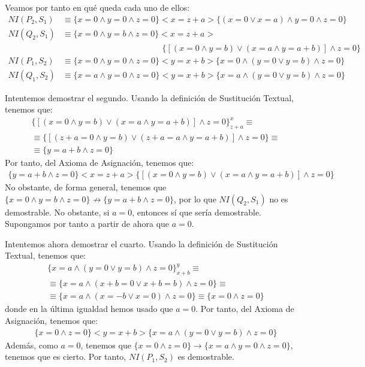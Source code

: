 \begin{ejercicio}
    Veamos por tanto en qué queda cada uno de ellos:
    \begin{align*}
        NI(P_2, S_1) & \equiv \{x=0 \land y=0 \land z=0\} <x=z+a> \{(x=0\lor x=a) \land y=0 \land z=0\} \\
        NI(Q_2, S_1) & \equiv \{x=0 \land y=b \land z=0\} <x=z+a>\\&\hspace{5cm} \{[(x=0\land y=b) \lor (x=a\land y=a+b)] \land z=0\} \\
        NI(P_1, S_2) & \equiv \{x=0 \land y=0 \land z=0\} <y=x+b> \{x=0 \land (y=0\lor y=b) \land z=0\} \\
        NI(Q_1, S_2) & \equiv \{x=a \land y=0 \land z=0\} <y=x+b> \{x=a \land (y=0\lor y=b) \land z=0\}
    \end{align*}

    Intentemos demostrar el segundo. Usando la definición de Sustitución Textual, tenemos que:
    \begin{multline*}
        \{[(x=0\land y=b) \lor (x=a\land y=a+b)] \land z=0\}_{z+a}^x \equiv \\ \equiv \{[(z+a=0\land y=b) \lor (z+a=a\land y=a+b)] \land z=0\} \equiv \\ \equiv \{y=a+b \land z=0\}
    \end{multline*}
    Por tanto, del Axioma de Asignación, tenemos que:
    \begin{multline*}
        \{y=a+b \land z=0\} <x=z+a> \{[(x=0\land y=b) \lor (x=a\land y=a+b)] \land z=0\}
    \end{multline*}
    No obstante, de forma general, tenemos que $\{x=0\land y=b\land z=0\}\not\rightarrow\{y=a+b \land z=0\}$, por lo que $NI(Q_2, S_1)$ no es demostrable. No obstante, si $a=0$, entonces sí que sería demostrable. Supongamos por tanto a partir de ahora que \ul{$a=0$}.

    Intentemos ahora demostrar el cuarto. Usando la definición de Sustitución Textual, tenemos que:
    \begin{multline*}
        \{x=a \land (y=0 \lor y=b) \land z = 0\}_{x+b}^y \equiv \\ \equiv \{x=a \land (x+b=0 \lor x+b=b) \land z = 0\} \equiv \\ \equiv \{x=a \land (x=-b\lor x=0) \land z = 0\} \equiv 
        \{x=0 \land z = 0\}
    \end{multline*}
    donde en la última igualdad hemos usado que \ul{$a=0$}. Por tanto, del Axioma de Asignación, tenemos que:
    \begin{multline*}
        \{x=0 \land z = 0\} <y=x+b> \{x=a \land (y=0 \lor y=b) \land z = 0\}
    \end{multline*}
    Además, como \ul{$a=0$}, tenemos que $\{x=0\land z=0\}\rightarrow\{x=a \land y=0 \land z=0\}$, tenemos que es cierto. Por tanto, $NI(P_1, S_2)$ es demostrable.


\end{ejercicio}
